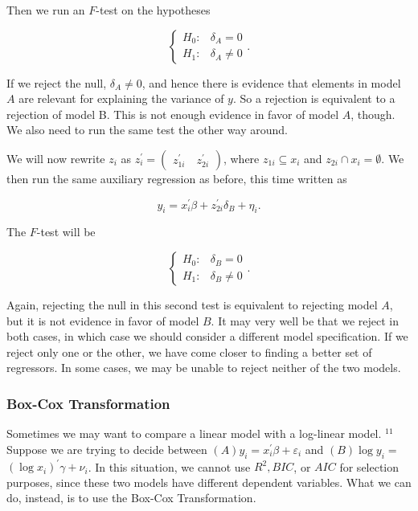 Then we run an $F$-test on the hypotheses

$$
\left\{\begin{array}{ll}
H_{0}: & \delta_{A}=0 \\
H_{1}: & \delta_{A} \neq 0
\end{array} .\right.
$$

If we reject the null, $\delta_{A} \neq 0$, and hence there is evidence that elements in model $A$ are relevant for explaining the variance of $y$. So a rejection is equivalent to a rejection of model B. This is not enough evidence in favor of model $A$, though. We also need to run the same test the other way around.

We will now rewrite $z_{i}$ as $z_{i}^{\prime}=\left(\begin{array}{cc}z_{1 i}^{\prime} \quad z_{2 i}^{\prime}\end{array}\right)$, where $z_{1 i} \subseteq x_{i}$ and $z_{2 i} \cap x_{i}=\emptyset$. We then run the same auxiliary regression as before, this time written as

$$
y_{i}=x_{i}^{\prime} \beta+z_{2 i}^{\prime} \delta_{B}+\eta_{i} .
$$

The $F$-test will be

$$
\left\{\begin{array}{ll}
H_{0}: & \delta_{B}=0 \\
H_{1}: & \delta_{B} \neq 0
\end{array} .\right.
$$

Again, rejecting the null in this second test is equivalent to rejecting model $A$, but it is not evidence in favor of model $B$. It may very well be that we reject in both cases, in which case we should consider a different model specification. If we reject only one or the other, we have come closer to finding a better set of regressors. In some cases, we may be unable to reject neither of the two models.

\subsubsection{Box-Cox Transformation}
Sometimes we may want to compare a linear model with a log-linear model. ${ }^{11}$ Suppose we are trying to decide between $(A) y_{i}=x_{i}^{\prime} \beta+\varepsilon_{i}$ and $(B) \log y_{i}=$ $\left(\log x_{i}\right)^{\prime} \gamma+\nu_{i}$. In this situation, we cannot use $R^{2}, B I C$, or $A I C$ for selection purposes, since these two models have different dependent variables. What we can do, instead, is to use the Box-Cox Transformation.

